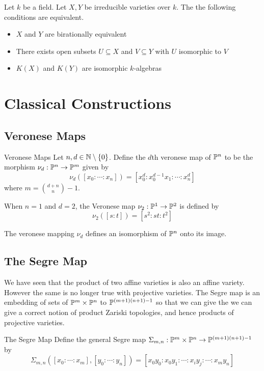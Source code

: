 \documentclass[a4paper]{article}
\begin{document}
\begin{crl}{}{} Let $k$ be a field. Let $X,Y$ be irreducible varieties over $k$. The the following conditions are equivalent. 
\begin{itemize}
\item $X$ and $Y$ are birationally equivalent
\item There exists open subsets $U\subseteq X$ and $V\subseteq Y$ with $U$ isomorphic to $V$
\item $K(X)$ and $K(Y)$ are isomorphic $k$-algebras
\end{itemize}
\end{crl}

\pagebreak
\section{Classical Constructions}
\subsection{Veronese Maps}
\begin{defn}{Veronese Maps}{} Let $n,d\in\mathbb{N}\setminus\{0\}$. Define the $d$th veronese map of $\mathbb{P}^n$ to be the morphism $\nu_d:\mathbb{P}^n\to\mathbb{P}^m$ given by $$\nu_d([x_0:\cdots:x_n])=[x_0^d:x_0^{d-1}x_1:\cdots:x_n^d]$$ where $m=\binom{d+n}{n}-1$. 
\end{defn}

When $n=1$ and $d=2$, the Veronese map $\nu_2:\mathbb{P}^1\to\mathbb{P}^2$ is defined by $$\nu_2([s:t])=[s^2:st:t^2]$$

\begin{prp}{}{} The veronese mapping $\nu_d$ defines an isomorphism of $\mathbb{P}^n$ onto its image. 
\end{prp}

\subsection{The Segre Map}
We have seen that the product of two affine varieties is also an affine variety. However the same is no longer true with projective varieties. The Segre map is an embedding of sets of $\mathbb{P}^m\times\mathbb{P}^n$ to $\mathbb{P}^{(m+1)(n+1)-1}$ so that we can give the we can give a correct notion of product Zariski topologies, and hence products of projective varieties. 

\begin{defn}{The Segre Map}{} Define the general Segre map $\Sigma_{m,n}:\mathbb{P}^m\times\mathbb{P}^n\to\mathbb{P}^{(m+1)(n+1)-1}$ by $$\Sigma_{m,n}([x_0:\cdots:x_m],[y_0:\cdots:y_n])=[x_0y_0:x_0y_1:\cdots:x_iy_j:\cdots:x_my_n]$$
\end{defn}
\end{document}
